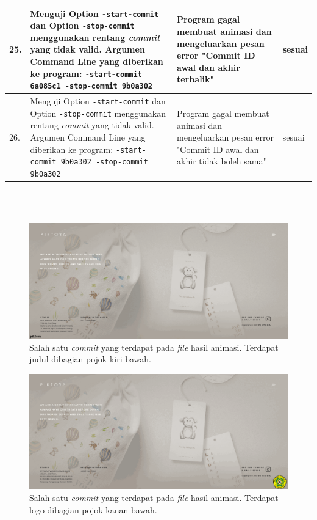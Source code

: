 \begin{table}[htbp]
\begin{tabular}{|p{0.3cm}|>{\raggedright} p{7 cm}| p{5.5 cm}| p{3 cm}|}
		25. & Menguji Option \texttt{-start-commit} dan Option \texttt{-stop-commit} menggunakan rentang \textit{commit} yang tidak valid. Argumen Command Line yang diberikan ke program: \texttt{-start-commit 6a085c1 -stop-commit 9b0a302} & Program gagal membuat animasi dan mengeluarkan pesan error "Commit ID awal dan akhir terbalik"  & sesuai\\ \hline
		26. & Menguji Option \texttt{-start-commit} dan Option \texttt{-stop-commit} menggunakan rentang \textit{commit} yang tidak valid. Argumen Command Line yang diberikan ke program: \texttt{-start-commit 9b0a302  -stop-commit 9b0a302} & Program gagal membuat animasi dan mengeluarkan pesan error "Commit ID awal dan akhir tidak boleh sama" & sesuai  \\ \hline




\end{tabular}
	\label{table:hasil_pengujian3}
\end{table}










\ \\
\ \\
\begin{figure}[H]
	\centering
		\includegraphics[scale=0.3]{Gambar/title.png}
	\caption{Salah satu \textit{commit} yang terdapat pada \textit{file} hasil animasi. Terdapat judul dibagian pojok kiri bawah.}
	\label{fig:title}
\end{figure}


\begin{figure}[H]
	\centering
		\includegraphics[scale=0.3]{Gambar/logo.png}
	\caption{Salah satu \textit{commit} yang terdapat pada \textit{file} hasil animasi. Terdapat logo dibagian pojok kanan bawah.}
	\label{fig:logo}
\end{figure}


